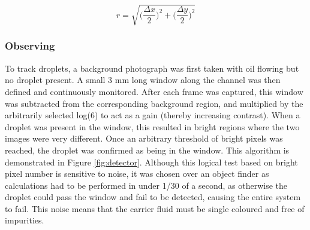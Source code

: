 \documentclass{physics_article_B}
\begin{document}
            \begin{equation}\label{eq:radii}
                r = \sqrt{\Big(\frac{\Delta x}{2}\Big)^2 + \Big(\frac{\Delta y}{2}\Big)^2}
            \end{equation}
            
            \vspace{3pt} 
        
        \subsubsection{Observing}
            To track droplets, a background photograph was first taken with oil flowing but no droplet present. A small 3 mm long window along the channel was then defined and continuously monitored. After each frame was captured, this window was subtracted from the corresponding background region, and multiplied by the arbitrarily selected log(6) to act as a gain (thereby increasing contrast). When a droplet was present in the window, this resulted in bright regions where the two images were very different. Once an arbitrary threshold of bright pixels was reached, the droplet was confirmed as being in the window. This algorithm is demonstrated in Figure \ref{fig:detector}. Although this logical test based on bright pixel number is sensitive to noise, it was chosen over an object finder as calculations had to be performed in under 1/30 of a second, as otherwise the droplet could pass the window and fail to be detected, causing the entire system to fail. This noise means that the carrier fluid must be single coloured and free of impurities. \\
            
\end{document}
